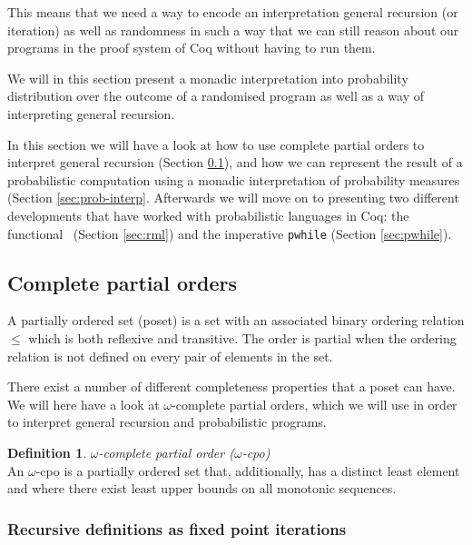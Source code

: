 \documentclass[11pt, leqno, titlepage]{article}
\theoremstyle{definition}
\newtheorem{defn}[thm]{Definition}
\begin{document}
This means that we need a way to encode an interpretation general recursion (or
iteration) as well as randomness in such a way that we can still reason about our
programs in the proof system of Coq without having to run them.

We will in this section present a monadic interpretation into probability
distribution over the outcome of a randomised program as well as a way of
interpreting general recursion.

In this section we will have a look at how to use complete partial orders to
interpret general recursion (Section \ref{sec:cpos}), and how we can represent the
result of a probabilistic computation using a monadic interpretation of probability
measures (Section \ref{sec:prob-interp}. Afterwards we will move on to presenting two
different developments that have worked with probabilistic languages in Coq: the
functional \rml\ (Section \ref{sec:rml}) and the imperative \texttt{pwhile} (Section
\ref{sec:pwhile}).

\subsection{Complete partial orders}\label{sec:cpos}

A partially ordered set (poset) is a set with an associated binary ordering relation
$\leq$ which is both reflexive and transitive. The order is partial when the ordering
relation is not defined on every pair of elements in the set.

There exist a number of different completeness properties that a poset can have.
We will here have a look at $\omega$-complete partial orders, which we will use in
order to interpret general recursion and probabilistic programs. 

\begin{defn}
  \textit{$\omega$-complete partial order ($\omega$-cpo)}\\
  An $\omega$-cpo is a partially ordered set that, additionally, has a distinct least
  element and where there exist least upper bounds on all monotonic sequences. 
\end{defn}

\subsubsection{Recursive definitions as fixed point iterations}
\label{sec:fixp-iter}
\end{document}
